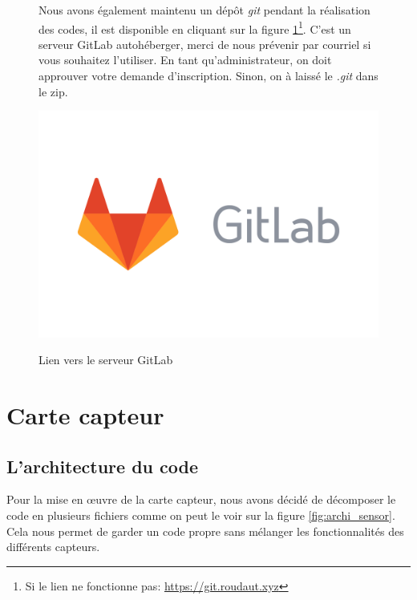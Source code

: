     \begin{figure}[!h]
        \centering
        \begin{minipage}{.48\linewidth}
            Nous avons également maintenu un dépôt \textit{git} pendant la réalisation des codes, il est disponible en cliquant sur la figure \ref{fig:gitlab}\footnote{Si le lien ne fonctionne pas: \href{https://git.roudaut.xyz}{https://git.roudaut.xyz}}. 
            C'est un serveur GitLab autohéberger, merci de nous prévenir par courriel si vous souhaitez l'utiliser. En tant qu'administrateur, on doit approuver votre demande d'inscription. Sinon, on à laissé le \textit{.git} dans le zip.
        \end{minipage}\hfill
        \begin{minipage}{.48\linewidth}
            \begin{center}
                \begin{center}
                    \href{https://git.roudaut.xyz}{\includegraphics[width=.8\textwidth]{img/code/GitLab.png}}
                    \caption{\label{fig:gitlab}Lien vers le serveur GitLab}  
                \end{center}
            \end{center}
        \end{minipage}
    \end{figure}








    \section{Carte capteur}
        \subsection{L'architecture du code}
            Pour la mise en œuvre de la carte capteur, nous avons décidé de décomposer le code en plusieurs fichiers comme on peut le voir sur la figure \ref{fig:archi_sensor}. Cela nous permet de garder un code propre sans mélanger les fonctionnalités
            des différents capteurs.

